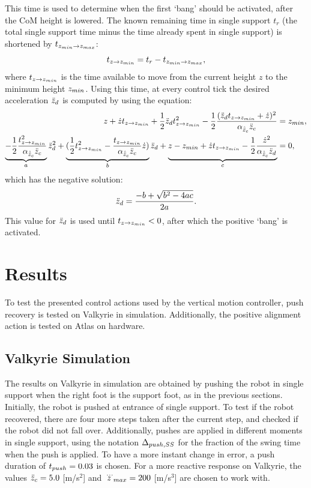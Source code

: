 This time is used to determine when the first `bang' should be activated, after the \ac{CoM} height is lowered. The known remaining time in single support $t_{r}$ (the total single support time minus the time already spent in single support) is shortened by $ t_{z_{min} \rightarrow z_{max}}$:
\begin{equation}
	t_{z \rightarrow z_{min}} =t_{r} - t_{z_{min} \rightarrow z_{max}},
\end{equation}
where $t_{z \rightarrow z_{min}} $ is the time available to move from the current height $z$ to the minimum height $z_{min}$. Using this time, at every control tick the desired acceleration $\ddot{z}_d$ is computed by using the equation:
\begin{align}
	z + \dot{z}t_{z \rightarrow z_{min}} + \frac{1}{2}\ddot{z}_d t_{z \rightarrow z_{min}}^2 - \frac{1}{2}\frac{(\ddot{z}_d t_{z \rightarrow z_{min}} + \dot{z})^2}{\alpha_{\hat{\ddot{z}}_{c}} \ddot{z}_{c}} &= z_{min}, \\
	\underbrace{-\frac{1}{2}\frac{t_{z \rightarrow z_{min}}^2}{\alpha_{\hat{\ddot{z}}_{c}} \ddot{z}_{c}}}_a \ddot{z}_d^2 + \underbrace{(\frac{1}{2}t_{z \rightarrow z_{min}}^2-\frac{t_{z \rightarrow z_{min}}}{\alpha_{\hat{\ddot{z}}_{c}} \ddot{z}_{c}} \dot{z})}_b \ddot{z}_d + \underbrace{z -z_{min} +\dot{z}t_{z \rightarrow z_{min}} -\frac{1}{2}\frac{\dot{z}^2}{\alpha_{\hat{\ddot{z}}_{c}} \ddot{z}_d}}_c&=0,
\end{align}
which has the negative solution:
\begin{equation}
 	\ddot{z}_d = \frac{-b + \sqrt{b^2-4ac}}{2a}.
\end{equation}
This value for $\ddot{z}_d$ is used until $t_{z \rightarrow z_{min}}<0$, after which the positive `bang' is activated. 

\section{Results}
To test the presented control actions used by the vertical motion controller, push recovery is tested on Valkyrie in simulation. Additionally, the positive alignment action is tested on Atlas on hardware.
\subsection{Valkyrie Simulation}
The results on Valkyrie in simulation are obtained by pushing the robot in single support when the right foot is the support foot, as in the previous sections. Initially, the robot is pushed at entrance of single support. To test if the robot recovered, there are four more steps taken after the current step, and checked if the robot did not fall over. Additionally, pushes are applied in different moments in single support, using the notation $\Delta_{push,SS}$ for the fraction of the swing time when the push is applied. To have a more instant change in error, a push duration of $t_{push}=0.03$ is chosen. For a more reactive response on Valkyrie, the values $\ddot{z}_{c}=5.0$ [m/s$^2$] and $\dddot{z}_{max}=200$ [m/s$^3$] are chosen to work with.


